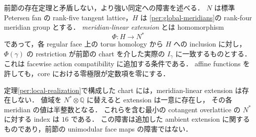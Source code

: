 前節の存在定理と矛盾しない，より強い同定への障害を述べる．
$N$ は標準 Petersen fan の rank-five tangent lattice，$H$ は
\eqref{per:global-meridians}の rank-four meridian group とする．
\emph{meridian-linear extension} とは homomorphism
\[
 \Phi:H\longrightarrow N^*
\]
であって，各 regular face 上の torus homology から $H$ への inclusion に対し，
$\Phi(\gamma)$ の restriction が前節の chart を介した実際の $I_\gamma$ に一致するものとする．
これは facewise action compatibility に追加する条件である．
affine functions を許しても，core における零極限が定数項を零にする．

\begin{theorem}
\label{per:half-integral-obstruction}
定理\ref{per:local-realization}で構成した chart には，meridian-linear extension は存在しない．
値域を $N^*\otimes\mathbb Q$ に替えると extension は一意に存在し，
その各 meridian の値は半整数となる．
これらを含む最小の cotangent overlattice の $N^*$ に対する index は $16$ である．
この障害は追加した ambient extension に関するものであり，前節の unimodular face maps の障害ではない．
\end{theorem}

